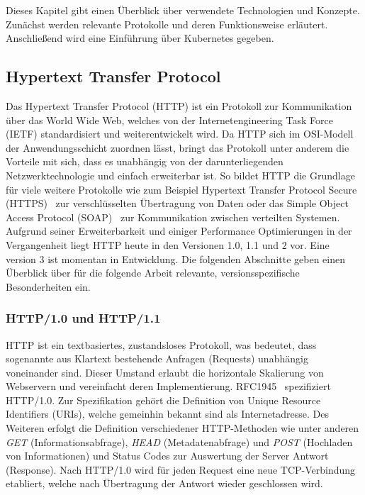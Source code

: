 Dieses Kapitel gibt einen Überblick über verwendete Technologien und Konzepte.
Zunächst werden relevante Protokolle und deren Funktionsweise erläutert.
Anschließend wird eine Einführung über Kubernetes gegeben.

\subsection{Hypertext Transfer Protocol}\label{subsec:hyper-text-transfer-protocol}

Das Hypertext Transfer Protocol (HTTP) ist ein Protokoll zur Kommunikation über das World Wide Web, welches von der Internetengineering Task Force (IETF) standardisiert und weiterentwickelt wird.
Da HTTP sich im OSI-Modell der Anwendungsschicht zuordnen lässt, bringt das Protokoll unter anderem die Vorteile mit sich, dass es unabhängig von der darunterliegenden Netzwerktechnologie und einfach erweiterbar ist.
So bildet HTTP die Grundlage für viele weitere Protokolle wie zum Beispiel Hypertext Transfer Protocol Secure (HTTPS)~\cite{rfc2818} zur verschlüsselten Übertragung von Daten oder das Simple Object Access Protocol (SOAP)~\cite{SOAP-20000508} zur Kommunikation zwischen verteilten Systemen.
Aufgrund seiner Erweiterbarkeit und einiger Performance Optimierungen in der Vergangenheit liegt HTTP heute in den Versionen 1.0, 1.1 und 2 vor.
Eine version 3 ist momentan in Entwicklung.
Die folgenden Abschnitte geben einen Überblick über für die folgende Arbeit relevante, versionsspezifische Besonderheiten ein.

\subsubsection{HTTP/1.0 und HTTP/1.1}
HTTP ist ein textbasiertes, zustandsloses Protokoll, was bedeutet, dass sogenannte aus Klartext bestehende Anfragen (Requests) unabhängig voneinander sind.
Dieser Umstand erlaubt die horizontale Skalierung von Webservern und vereinfacht deren Implementierung.
RFC1945~\cite{rfc1945} spezifiziert HTTP/1.0.
Zur Spezifikation gehört die Definition von Unique Resource Identifiers (URIs), welche gemeinhin bekannt sind als Internetadresse.
Des Weiteren erfolgt die Definition verschiedener HTTP-Methoden wie unter anderen \textit{GET} (Informationsabfrage), \textit{HEAD} (Metadatenabfrage) und \textit{POST} (Hochladen von Informationen) und Status Codes zur Auswertung der Server Antwort (Response).
Nach HTTP/1.0 wird für jeden Request eine neue TCP-Verbindung etabliert, welche nach Übertragung der Antwort wieder geschlossen wird.

